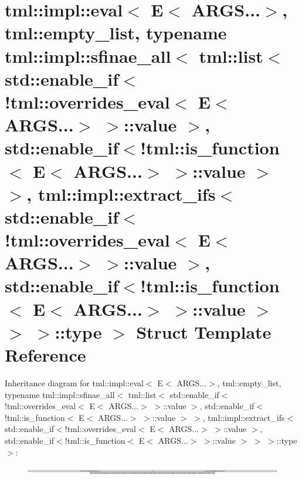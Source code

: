 \hypertarget{structtml_1_1impl_1_1eval_3_01E_3_01ARGS_8_8_8_4_00_01tml_1_1empty__list_00_01typename_01tml_1_15234929f348c4ec1e3e8b9d731dbe400}{\section{tml\+:\+:impl\+:\+:eval$<$ E$<$ A\+R\+G\+S...$>$, tml\+:\+:empty\+\_\+list, typename tml\+:\+:impl\+:\+:sfinae\+\_\+all$<$ tml\+:\+:list$<$ std\+:\+:enable\+\_\+if$<$!tml\+:\+:overrides\+\_\+eval$<$ E$<$ A\+R\+G\+S...$>$ $>$\+:\+:value $>$, std\+:\+:enable\+\_\+if$<$!tml\+:\+:is\+\_\+function$<$ E$<$ A\+R\+G\+S...$>$ $>$\+:\+:value $>$ $>$, tml\+:\+:impl\+:\+:extract\+\_\+ifs$<$ std\+:\+:enable\+\_\+if$<$!tml\+:\+:overrides\+\_\+eval$<$ E$<$ A\+R\+G\+S...$>$ $>$\+:\+:value $>$, std\+:\+:enable\+\_\+if$<$!tml\+:\+:is\+\_\+function$<$ E$<$ A\+R\+G\+S...$>$ $>$\+:\+:value $>$ $>$ $>$\+:\+:type $>$ Struct Template Reference}
\label{structtml_1_1impl_1_1eval_3_01E_3_01ARGS_8_8_8_4_00_01tml_1_1empty__list_00_01typename_01tml_1_15234929f348c4ec1e3e8b9d731dbe400}
}
Inheritance diagram for tml\+:\+:impl\+:\+:eval$<$ E$<$ A\+R\+G\+S...$>$, tml\+:\+:empty\+\_\+list, typename tml\+:\+:impl\+:\+:sfinae\+\_\+all$<$ tml\+:\+:list$<$ std\+:\+:enable\+\_\+if$<$!tml\+:\+:overrides\+\_\+eval$<$ E$<$ A\+R\+G\+S...$>$ $>$\+:\+:value $>$, std\+:\+:enable\+\_\+if$<$!tml\+:\+:is\+\_\+function$<$ E$<$ A\+R\+G\+S...$>$ $>$\+:\+:value $>$ $>$, tml\+:\+:impl\+:\+:extract\+\_\+ifs$<$ std\+:\+:enable\+\_\+if$<$!tml\+:\+:overrides\+\_\+eval$<$ E$<$ A\+R\+G\+S...$>$ $>$\+:\+:value $>$, std\+:\+:enable\+\_\+if$<$!tml\+:\+:is\+\_\+function$<$ E$<$ A\+R\+G\+S...$>$ $>$\+:\+:value $>$ $>$ $>$\+:\+:type $>$\+:\begin{figure}[H]
\begin{center}
\leavevmode
\includegraphics[height=0.278054cm]{structtml_1_1impl_1_1eval_3_01E_3_01ARGS_8_8_8_4_00_01tml_1_1empty__list_00_01typename_01tml_1_15234929f348c4ec1e3e8b9d731dbe400}
\end{center}
\end{figure}

